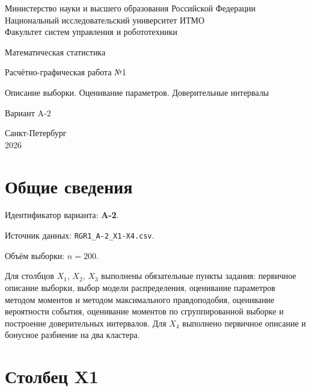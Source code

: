 \documentclass[12pt,a4paper]{article}
\begin{document}
\begin{titlepage}
    \begin{center}
        Министерство науки и высшего образования Российской Федерации\\
        Национальный исследовательский университет ИТМО\\
        Факультет систем управления и робототехники

        \vfill

        {\large Математическая статистика}

        \vspace{1cm}

        {\LARGE Расчётно-графическая работа №1}

        \vspace{0.5cm}

        {\Large Описание выборки. Оценивание параметров. Доверительные интервалы}

        \vspace{1.5cm}

        {\large Вариант A-2}

        \vfill

        Санкт-Петербург\\
        2026
    \end{center}
\end{titlepage}

\tableofcontents
\newpage

\section{Общие сведения}

Идентификатор варианта: \textbf{A-2}.

Источник данных: \texttt{RGR1\_A-2\_X1-X4.csv}.

Объём выборки: \textbf{$n = 200$}.

Для столбцов $X_1$, $X_2$, $X_3$ выполнены обязательные пункты задания: первичное описание выборки, выбор модели распределения, оценивание параметров методом моментов и методом максимального правдоподобия, оценивание вероятности события, оценивание моментов по сгруппированной выборке и построение доверительных интервалов. Для $X_4$ выполнено первичное описание и бонусное разбиение на два кластера.

\section{Столбец X1}
\end{document}
